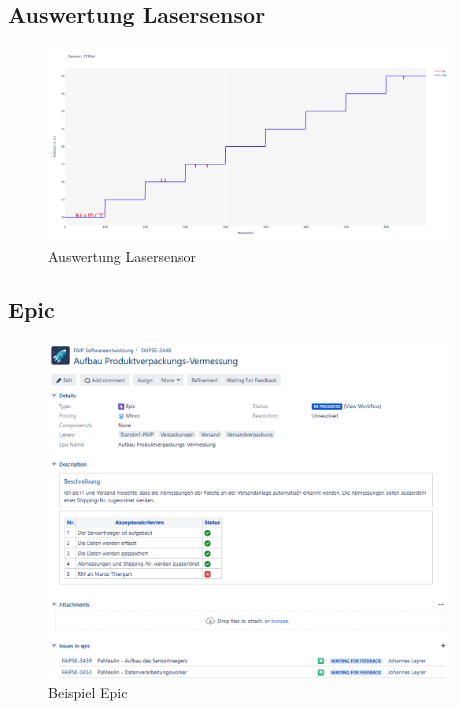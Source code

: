 \subsection{Auswertung Lasersensor}

\begin{figure}[htpb]
  \centering
  \includegraphics[width=0.95\textwidth]{./pics/plots/tfmini_plot.png}
  \caption{Auswertung Lasersensor}
  \label{appendix:fig:laserSensorAuswertung}
\end{figure}


\newpage
\subsection{Epic}

\begin{figure}[htpb]
  \includegraphics[width=0.95\textwidth]{./pics/Ticket.png}
  \caption{Beispiel Epic}
  \label{appendix:fig:ticket}
\end{figure}


